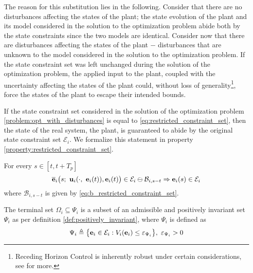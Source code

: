 The reason for this substitution lies in the following. Consider that there
are no disturbances affecting the states of the plant; the state evolution of
the plant and its model considered in the solution to the optimization problem
abide both by the state constraints since the two models are identical. Consider
now that there are disturbances affecting the states of the plant $-$
disturbances that are unknown to the model considered in the solution to the
optimization problem. If the state constraint set was left unchanged during the
solution of the optimization problem, the applied input to the plant, coupled
with the uncertainty affecting the states of the plant could, without loss of
generality\footnote{Receding Horizon Control is inherently robust
under certain considerations, see \cite{Fontes2007} for more.}, force the states
of the plant to escape their intended bounds.

If the state constraint set considered in the solution of the optimization
problem \eqref{problem:opt_with_disturbances} is equal to
\eqref{eq:restricted_constraint_set}, then the state of the real system,
the plant, is guaranteed to abide by the original state constraint set
$\mathcal{E}_i$. We formalize this statement in property
\eqref{property:restricted_constraint_set}.

\begin{bw_box}
  \begin{property}
  \label{property:restricted_constraint_set}

  For every $s \in [t, t + T_p]$
  \begin{align}
    \overline{\bm{\mathbf{e}}}_i\big( s;\ \bm{\mathbf{u}}_i(\cdot,\ \bm{\mathbf{e}}_i(t)), \bm{\mathbf{e}}_i(t) \big) \in \mathcal{E}_i \ominus \mathcal{B}_{i,s-t}
    \Rightarrow
    \bm{\mathbf{e}}_i(s) \in \mathcal{E}_i
  \end{align}
  where $\mathcal{B}_{i,s-t}$ is given by \eqref{eq:b_restricted_constraint_set}.
\end{property}
\end{bw_box}



\begin{bw_box}
  \begin{assumption}
  \label{ass:psi}
  The terminal set $\Omega_i \subseteq \Psi_i$ is a subset of an admissible and
  positively invariant set $\Psi_i$ as per definition
  \eqref{def:positively_invariant}, where $\Psi_i$ is defined as
  \begin{align}
    \Psi_i \triangleq \big\{\bm{\mathbf{e}}_i \in \mathcal{E}_i : V_i(\bm{\mathbf{e}}_i)
      \leq \varepsilon_{\Psi_i} \big\},\ \varepsilon_{\Psi_i} > 0
  \end{align}
  \end{assumption}
\end{bw_box}

